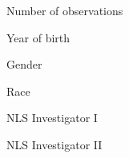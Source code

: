 \begin{frame}\begin{figure}[htp]\centering
\caption{Number of observations}
\end{figure}\end{frame}
\begin{frame}\begin{figure}[htp]\centering
\caption{Year of birth}
\end{figure}\end{frame}
\begin{frame}\begin{figure}[htp]\centering
\caption{Gender}
\end{figure}\end{frame}
\begin{frame}\begin{figure}[htp]\centering
\caption{Race}
\end{figure}\end{frame}
\begin{frame}\begin{figure}[htp]\centering
\caption{NLS Investigator I}
\end{figure}\end{frame}
\begin{frame}\begin{figure}[htp]\centering
\caption{NLS Investigator II}
\end{figure}\end{frame}
